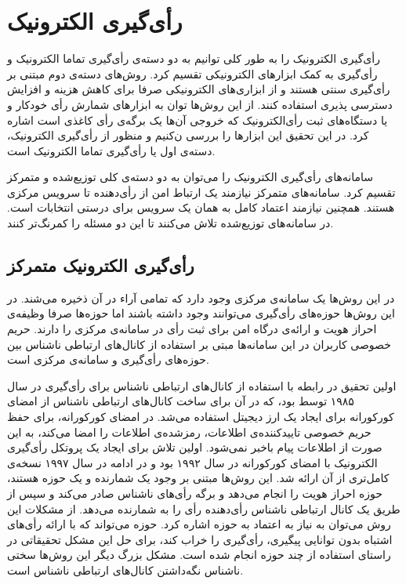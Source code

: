 \section{رأی‌گیری الکترونیک}
رأی‌گیری الکترونیک را به طور کلی ‌‌توانیم به دو دسته‌ی رأی‌گیری تماما الکترونیک و رأی‌گیری به کمک ابزار‌های الکترونیکی تقسیم کرد. روش‌های دسته‌ی دوم مبتنی بر رأی‌گیری سنتی هستند و از ابزاری‌های الکترونیکی صرفا برای کاهش هزینه و افزایش دسترسی پذیری استفاده ‌‌کنند. از این روش‌ها ‌‌توان به ابزارهای شمارش رأی خودکار و یا دستگاه‌های ثبت رأی‌الکترونیک که خروجی آن‌ها یک برگه‌ی رأی‌ کاغذی
است اشاره کرد. در این تحقیق این ابزارها را بررسی ن‌‌کنیم و منظور از رأی‌گیری الکترونیک، دسته‌ی اول یا رأی‌گیری تماما الکترونیک است.
\par
سامانه‌های رأی‌گیری الکترونیک را می‌توان به دو د‌سته‌ی کلی توزیع‌شده و متمرکز تقسیم کرد. سامانه‌های متمرکز نیازمند یک ارتباط امن از رأی‌دهنده تا سرویس مرکزی هستند. همچنین نیازمند اعتماد کامل به همان یک سرویس برای درستی انتخابات است. در سامانه‌های توزیع‌شده تلاش می‌کنند تا این دو مسئله را کمرنگ‌تر کنند.

\subsection{رأی‌گیری الکترونیک متمرکز}
در این روش‌ها یک سامانه‌ی مرکزی وجود دارد که تمامی آراء در آن ذخیره می‌شند. در این روش‌ها حوزه‌های رأی‌گیری می‌توانند وجود داشته باشند اما حوزه‌ها صرفا وظیفه‌ی احراز هویت و ارائه‌ی درگاه امن برای ثبت رأی در سامانه‌ی مرکزی را دارند. حریم خصوصی کاربران در این سامانه‌ها مبتی بر استفاده از کانال‌های ارتباطی ناشناس 
بین حوزه‌های رأی‌گیری و سامانه‌ی مرکزی است.
\par
اولین تحقیق در رابطه با استفاده‌ از کانال‌های ارتباطی ناشناس برای رأی‌گیری در سال ۱۹۸۵ توسط 
\cite{Chaum}
بود، که در آن برای ساخت‌ کانال‌های ارتباطی ناشناس از امضای کورکورانه 
\cite{blindsig}
برای ایجاد یک ارز دیجیتل استفاده می‌شد. در امضای کورکورانه، برای حفظ حریم خصوصی تاییدکننده‌ی اطلاعات، رمزشده‌ی اطلاعات را امضا می‌کند، به این صورت از اطلاعات پیام باخبر نمی‌شود. اولین تلاش برای ایجاد یک پروتکل رأی‌گیری الکترونیک با امضای کورکورانه در سال ۱۹۹۲ 
\cite{foo92}
بود و در ادامه در سال ۱۹۹۷
\cite{improveblind}
نسخه‌ی کامل‌تری از آن ارائه شد. این روش‌ها مبتنی بر وجود یک شمارنده و یک حوزه هستند، حوزه احراز هویت را انجام می‌دهد و برگه‌ رأی‌های ناشناس صادر می‌کند و سپس از طریق یک کانال ارتباطی ناشناس رأی‌دهنده رأی را به شمارنده می‌دهد. از مشکلات این روش می‌توان به نیاز به اعتماد به حوزه اشاره کرد. حوزه می‌تواند که با ارائه رأی‌های اشتباه بدون توانایی پیگیری، رأی‌گیری را خراب کند، برای حل این مشکل تحقیقاتی
\cite{multiteller}
در راستای استفاده از چند حوزه انجام شده است. مشکل بزرگ دیگر این روش‌ها
\cite{anonchan}
سختی ناشناس نگه‌داشتن کانال‌های ارتباطی ناشناس است.

